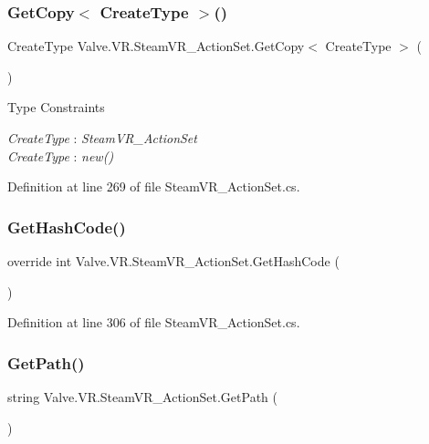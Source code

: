 \subsubsection{\texorpdfstring{GetCopy$<$ CreateType $>$()}{GetCopy< CreateType >()}}
{\footnotesize\ttfamily Create\+Type Valve.\+V\+R.\+Steam\+V\+R\+\_\+\+Action\+Set.\+Get\+Copy$<$ Create\+Type $>$ (\begin{DoxyParamCaption}{ }\end{DoxyParamCaption})}

\begin{Desc}
\item[Type Constraints]\begin{description}
\item[{\em Create\+Type} : {\em Steam\+V\+R\+\_\+\+Action\+Set}]\item[{\em Create\+Type} : {\em new()}]\end{description}
\end{Desc}


Definition at line 269 of file Steam\+V\+R\+\_\+\+Action\+Set.\+cs.

\mbox{\label{class_valve_1_1_v_r_1_1_steam_v_r___action_set_a77c22e696784714f4ce7cc3e846f1534}} 
\subsubsection{\texorpdfstring{GetHashCode()}{GetHashCode()}}
{\footnotesize\ttfamily override int Valve.\+V\+R.\+Steam\+V\+R\+\_\+\+Action\+Set.\+Get\+Hash\+Code (\begin{DoxyParamCaption}{ }\end{DoxyParamCaption})}



Definition at line 306 of file Steam\+V\+R\+\_\+\+Action\+Set.\+cs.

\mbox{\label{class_valve_1_1_v_r_1_1_steam_v_r___action_set_a2d9abb96df39d29be3ea763a95d56b9c}} 
\subsubsection{\texorpdfstring{GetPath()}{GetPath()}}
{\footnotesize\ttfamily string Valve.\+V\+R.\+Steam\+V\+R\+\_\+\+Action\+Set.\+Get\+Path (\begin{DoxyParamCaption}{ }\end{DoxyParamCaption})}



